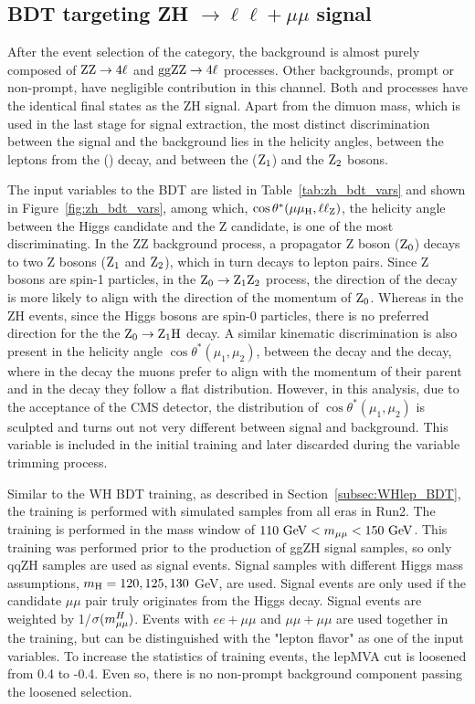 \subsection{BDT targeting \texorpdfstring{ZH $\to \ell\ell+\mu\mu$}{ZH to 4l} signal}\label{subsec:ZHlep_BDT}

After the event selection of the \ZH category, the background is almost purely composed of $\mathrm{Z}\mathrm{Z} \to 4\ell$ and $\mathrm{g}\mathrm{g}\mathrm{Z}\mathrm{Z} \to 4 \ell$ processes. 
Other backgrounds, prompt or non-prompt, have negligible contribution in this channel. 
Both \ZZ and \ggZZ processes have the identical final states as the ZH signal. 
Apart from the dimuon mass, which is used in the last stage for 
signal extraction, the most distinct discrimination between the signal and the background 
lies in the helicity angles, between the leptons from the \PH (\PZ) decay, 
and between the \PH ($\mathrm{Z}_{1}$) and the $\mathrm{Z}_{2}$ bosons.

The input variables to the BDT are listed in Table~\ref{tab:zh_bdt_vars} and shown in Figure~\ref{fig:zh_bdt_vars}, 
among which, $\cos\theta^*(\mu\mu_{\mathrm{H}},\ell\ell_{\mathrm{Z}})$, the helicity angle between 
the Higgs candidate and the Z candidate, is one of the most discriminating. 
In the ZZ background process, a propagator Z boson ($\mathrm{Z}_{0}$) decays to two Z bosons ($\mathrm{Z}_{1}$ and $\mathrm{Z}_{2}$),
which in turn decays to lepton pairs. Since Z bosons are spin-1 particles, in the $\mathrm{Z}_{0} \to \mathrm{Z}_{1}\mathrm{Z}_{2}$ 
process, the direction of the decay is more likely to align with the direction of the momentum of $\mathrm{Z}_{0}$.
Whereas in the ZH events, since the Higgs bosons are spin-0 particles, there is no preferred direction for 
the the $\mathrm{Z}_{0} \to \mathrm{Z}_{1}\mathrm{H}$ decay. %
A similar kinematic discrimination is also present in the helicity angle $\cos\theta^*(\mu_{1}, \mu_{2})$, 
between the \zmm decay and the \hmm decay, 
where in the \PZ decay the muons prefer to align with the momentum of their parent and in the \PH decay they follow a flat distribution. 
However, in this analysis, due to the acceptance of the CMS detector, 
the distribution of $\cos\theta^*(\mu_{1}, \mu_{2})$ is sculpted and turns out not very different between signal and background. 
This variable is included in the initial training and later discarded during the variable trimming process.

Similar to the WH BDT training, as described in Section~\ref{subsec:WHlep_BDT}, 
the training is performed with simulated samples from all eras in Run2. The training is performed in the mass 
window of $110 ~\mbox{GeV}{} < m_{\mu\mu} < 150 ~\mbox{GeV}{}$.  This training was performed prior to the production
of ggZH signal samples, so only qqZH samples are used as signal events. 
Signal samples with different Higgs mass assumptions, $m_{\mathrm{H}} = 120, 125, 130$ GeV, are used. 
Signal events are only used if the candidate $\mu\mu$ pair truly originates from the Higgs decay.  
Signal events are weighted by 1/$\sigma(m_{\mu\mu}^{H})$.
Events with $ee+\mu\mu$ and $\mu\mu+\mu\mu$ are used together in the training, 
but can be distinguished with the "lepton flavor" as one of the input variables.  
To increase the statistics of training events, the lepMVA cut is loosened from 0.4 to -0.4.
Even so, there is no non-prompt background component passing the loosened selection.

